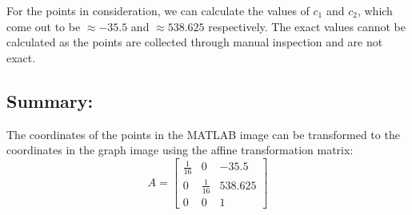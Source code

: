 \documentclass{article}
\begin{document}
For the points in consideration, we can calculate the values of $c_1$ and $c_2$, which come out to be $\approx-35.5$ and $\approx538.625$ respectively. The exact values cannot be calculated as the points are collected through manual inspection and are not exact.

\subsection*{Summary:} 
The coordinates of the points in the MATLAB image can be transformed to the coordinates in the graph image using the affine transformation matrix:
\begin{equation*}
A = \begin{bmatrix}
\frac{1}{16} & 0 & -35.5 \\
0 & \frac{1}{16} & 538.625 \\
0 & 0 & 1
\end{bmatrix}
\end{equation*}
\end{document}
